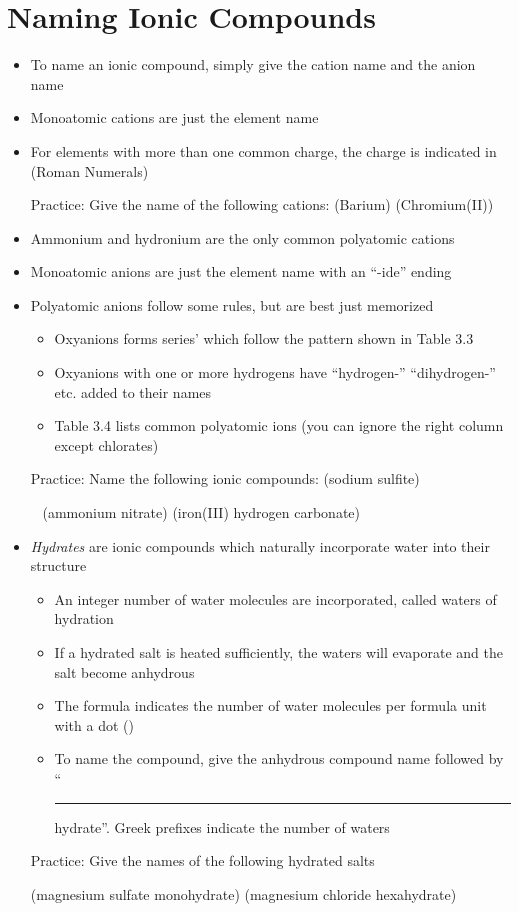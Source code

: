 \documentclass[12pt, openany, letterpaper]{memoir}
\begin{document}
\section{Naming Ionic Compounds}
\begin{itemize}
	\item To name an ionic compound, simply give the cation name and the anion name
	\item Monoatomic cations are just the element name
	\item For elements with more than one common charge, the charge is indicated in (Roman Numerals)

	      Practice: Give the name of the following cations:  (Barium) \hspace{1em}  (Chromium(II))
	\item Ammonium and hydronium are the only common polyatomic cations
	\item Monoatomic anions are just the element name with an ``-ide'' ending
	\item Polyatomic anions follow some rules, but are best just memorized
	      \begin{itemize}
		      \item Oxyanions forms series' which follow the pattern shown in Table 3.3
		      \item Oxyanions with one or more hydrogens have ``hydrogen-'' ``dihydrogen-'' etc. added to their names
		      \item Table 3.4 lists common polyatomic ions (you can ignore the right column except chlorates)
	      \end{itemize}

	      Practice: Name the following ionic compounds:   (sodium sulfite)

	      ~\hphantom{Practice:}  (ammonium nitrate) \hspace{1em}  (iron(III) hydrogen carbonate)
	\item \emph{Hydrates} are ionic compounds which naturally incorporate water into their structure
	      \begin{itemize}
		      \item An integer number of water molecules are incorporated, called waters of hydration
		      \item If a hydrated salt is heated sufficiently, the waters will evaporate and the salt become anhydrous
		      \item The formula indicates the number of water molecules per formula unit with a dot ()
		      \item To name the compound, give the anhydrous compound name followed by ``\rule[-1mm]{1in}{.1pt} hydrate''. Greek prefixes indicate the number of waters
	      \end{itemize}

	      Practice: Give the names of the following hydrated salts

	       (magnesium sulfate monohydrate)   (magnesium chloride hexahydrate)
\end{itemize}
\end{document}
